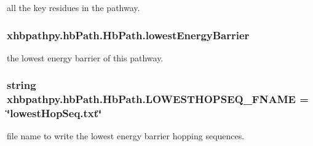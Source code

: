 all the key residues in the pathway. 

\hypertarget{classxhbpathpy_1_1hb_path_1_1_hb_path_a46d9c978e67884c56826acc632b2b242}{
\subsubsection[{lowest\-Energy\-Barrier}]{\setlength{\rightskip}{0pt plus 5cm}xhbpathpy.\-hb\-Path.\-Hb\-Path.\-lowest\-Energy\-Barrier}}\label{classxhbpathpy_1_1hb_path_1_1_hb_path_a46d9c978e67884c56826acc632b2b242}


the lowest energy barrier of this pathway. 

\hypertarget{classxhbpathpy_1_1hb_path_1_1_hb_path_a12f7c28f6247436f324bb976632b39b0}{
\subsubsection[{L\-O\-W\-E\-S\-T\-H\-O\-P\-S\-E\-Q\-\_\-\-F\-N\-A\-M\-E}]{\setlength{\rightskip}{0pt plus 5cm}string xhbpathpy.\-hb\-Path.\-Hb\-Path.\-L\-O\-W\-E\-S\-T\-H\-O\-P\-S\-E\-Q\-\_\-\-F\-N\-A\-M\-E = \char`\"{}lowest\-Hop\-Seq.\-txt\char`\"{}\hspace{0.3cm}{\ttfamily [static]}}}\label{classxhbpathpy_1_1hb_path_1_1_hb_path_a12f7c28f6247436f324bb976632b39b0}


file name to write the lowest energy barrier hopping sequences. 

